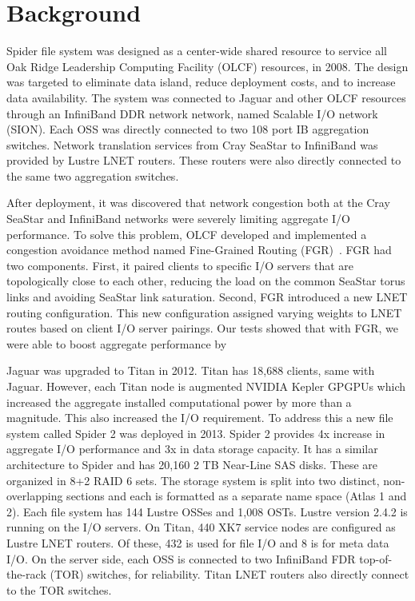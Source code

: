 \section{Background}

Spider file system was designed as a center-wide shared resource to service all
Oak Ridge Leadership Computing Facility (OLCF) resources, in 2008. The design
was targeted to eliminate data island, reduce deployment costs, and to increase
data availability. The system was connected to Jaguar and other OLCF resources
through an InfiniBand DDR network network, named Scalable I/O network (SION).
Each OSS was directly connected to two 108 port IB aggregation switches.
Network translation services from Cray SeaStar to InfiniBand was provided by
Lustre LNET routers. These routers were also directly connected to the same two
aggregation switches.    

After deployment, it was discovered that network congestion both at the Cray
SeaStar and InfiniBand networks were severely limiting aggregate I/O
performance. To solve this problem, OLCF developed and implemented a congestion
avoidance method named Fine-Grained Routing (FGR)~\cite{dillow-fgr}. FGR had
two components.  First, it paired clients to specific I/O servers that are
topologically close to each other, reducing the load on the common SeaStar
torus links and avoiding SeaStar link saturation. Second, FGR introduced a new
LNET routing configuration. This new configuration assigned varying weights to
LNET routes based on client I/O server pairings. Our tests showed that with
FGR, we were able to boost aggregate performance by %
 
Jaguar was upgraded to Titan in 2012. Titan has 18,688 clients, same with
Jaguar. However, each Titan node is augmented NVIDIA Kepler GPGPUs which
increased the aggregate installed computational power by more than a magnitude.
This also increased the I/O requirement. To address this a new file system
called Spider 2 was deployed in 2013. Spider 2 provides 4x increase in
aggregate I/O performance and 3x in data storage capacity. It has a similar
architecture to Spider and has 20,160 2 TB Near-Line SAS disks. These are
organized in 8+2 RAID 6 sets. The storage system is split into two distinct,
non-overlapping sections and each is formatted as a separate name space (Atlas
1 and 2). Each file system has 144 Lustre OSSes and 1,008 OSTs. Lustre version
2.4.2 is running on the I/O servers. On Titan, 440 XK7 service nodes are
configured as Lustre LNET routers. Of these, 432 is used for file I/O and 8 is
for meta data I/O.  On the server side, each OSS is connected to two InfiniBand
FDR top-of-the-rack (TOR) switches, for reliability. Titan LNET routers also
directly connect to the TOR switches.   

 

